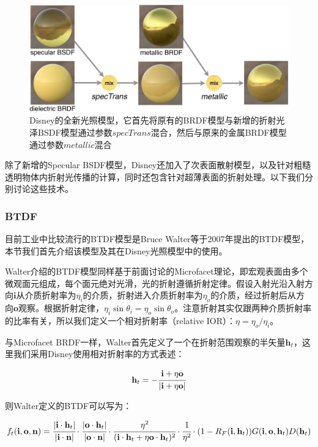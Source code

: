 \begin{figure}
	\includegraphics[width=\textwidth]{figures/intro/disney-bsdf}
	\caption{Disney的全新光照模型，它首先将原有的BRDF模型与新增的折射光泽BSDF模型通过参数$specTrans$混合，然后与原来的金属BRDF模型通过参数$metallic$混合}
	\label{f:intro-disney-bsdf}
\end{figure}

除了新增的Specular BSDF模型，Disney还加入了次表面散射模型，以及针对粗糙透明物体内折射光传播的计算，同时还包含针对超薄表面的折射处理。以下我们分别讨论这些技术。





\subsubsection{BTDF}
目前工业中比较流行的BTDF模型是Bruce Walter等\cite{a:Microfacetmodelsforrefractionthroughroughsurfaces}于2007年提出的BTDF模型，本节我们首先介绍该模型及其在Disney光照模型中的使用。

Walter介绍的BTDF模型同样基于前面讨论的Microfacet理论，即宏观表面由多个微观面元组成，每个面元绝对光滑，光的折射遵循折射定律。假设入射光沿入射方向$\mathbf{i}$从介质折射率为$\eta_i$的介质，折射进入介质折射率为$\eta_o$的介质，经过折射后从方向$\mathbf{o}$观察。根据折射定律，$\eta_i \sin\theta_i=\eta_o \sin\theta_o$。注意折射其实仅跟两种介质折射率的比率有关，所以我们定义一个相对折射率（relative IOR）：$\eta=\eta_o/\eta_i$。

与Microfacet BRDF一样，Walter首先定义了一个在折射范围观察的半矢量$\mathbf{h}_t$，这里我们采用Disney使用相对折射率的方式表述：

\begin{equation}
	\mathbf{h}_t=- \cfrac{\mathbf{i}+\eta\mathbf{o}}{|\mathbf{i}+\eta\mathbf{o}|}
\end{equation}

\noindent 则Walter定义的BTDF可以写为：

\begin{equation}
	f_t(\mathbf{i},\mathbf{o},\mathbf{n})= \cfrac{|\mathbf{i}\cdot\mathbf{h}_t|}{|\mathbf{i}\cdot\mathbf{n}|}\cdot \cfrac{|\mathbf{o}\cdot\mathbf{h}_t|}{|\mathbf{o}\cdot\mathbf{n}|}\cdot \cfrac{\eta^2}{(\mathbf{i}\cdot\mathbf{h}_t+\eta\mathbf{o}\cdot\mathbf{h}_t)^2}\cdot \cfrac{1}{\eta^2}\cdot (1-R_F(\mathbf{i},\mathbf{h}_t))G(\mathbf{i},\mathbf{o},\mathbf{h}_t)D(\mathbf{h}_t)
\end{equation}

